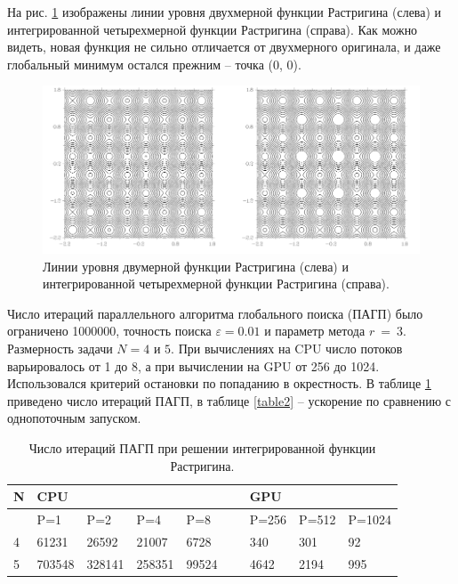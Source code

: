 \documentclass[10pt,a4paper]{book}
\begin{document}
На рис. \ref{fig:s2} изображены линии уровня двухмерной функции Растригина (слева) и интегрированной четырехмерной функции Растригина (справа). Как можно видеть, новая функция не сильно отличается от двухмерного оригинала, и даже глобальный минимум остался прежним – точка (0, 0).

\begin{figure}
\begin{center}
  \includegraphics[width=1.0\linewidth]{./pic/s2.png}
  \caption{Линии уровня двумерной функции Растригина (слева) и интегрированной четырехмерной функции Растригина (справа).}
  \label{fig:s2}  
\end{center}
\end{figure}


Число итераций параллельного алгоритма глобального поиска (ПАГП) было ограничено 1000000, точность поиска $\varepsilon=0.01$ и параметр метода $r\ =\ 3$. Размерность задачи $N = 4$ и $5$. При вычислениях на CPU число потоков варьировалось от 1 до 8, а при вычислении на GPU от 256 до 1024. Использовался критерий остановки по попаданию в окрестность. В таблице \ref{table1} приведено число итераций ПАГП, в таблице \ref{table2} – ускорение по сравнению с однопоточным запуском.



\begin{table}[!ht]
    \centering
            \caption{Число итераций ПАГП при решении интегрированной функции Растригина.}
    \label{table1}
    \begin{tabular}{|l|l|l|l|l|l|l|l|l|}
    \hline
        N & CPU &   & ~ & ~ & ~ & GPU  & ~ & ~ \\ \hline
        ~ & P=1 & P=2 & P=4 & P=8 &   & P=256 & P=512 & P=1024  \\ \hline
        4 & 61231 & 26592 & 21007 & 6728 &   & 340 & 301 & 92  \\ \hline
        5 & 703548 & 328141 & 258351 & 99524 &   & 4642 & 2194 & 995  \\ \hline
    \end{tabular}
\end{table}
\end{document}
